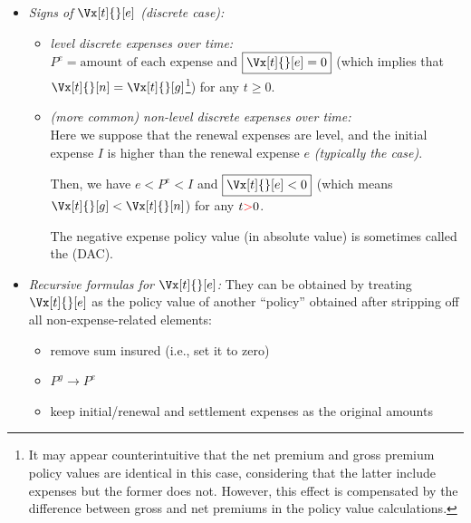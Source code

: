 \begin{enumerate}
\begin{enumerate}[label={(\arabic*)}]
\begin{itemize}
\begin{pf}
Next, for the formula of \(\Vx[t]{}[e]\), since \(P^e=P^g-P^n\), we have
\begin{align*}
\Vx[t]{}[e]&=\epvt{t}{\text{future expenses}}-\epvt{t}{\text{future expense loadings}} \\
&=\epvt{t}{\text{future benefits}}+\epvt{t}{\text{future
expenses}}-\epvt{t}{\text{future \textbf{gross} premiums}} \\
&\quad-[\epvt{t}{\text{future benefits}}-\epvt{t}{\text{future \textbf{net} premiums}}] \\
&=\Vx[t]{}[g]-\Vx[t]{}[n].
\end{align*}
\end{pf}

\item \emph{Signs of \(\Vx[t]{}[e]\) (discrete case):}
\begin{itemize}
\item \emph{level discrete expenses over time:} \\
\(\boxed{P^e=\text{amount of each expense}}\) and
\(\boxed{\Vx[t]{}[e]=0}\) (which implies that
\(\Vx[t]{}[n]=\Vx[t]{}[g]\)\footnote{ It may appear counterintuitive that the
net premium and gross premium policy values are identical in this case,
considering that the latter include expenses but the former does not. However,
this effect is compensated by the difference between gross and net premiums in
the policy value calculations.}) for any \(t\ge 0\).

\item \emph{(more common) non-level discrete expenses over time:}\\
Here we suppose that the renewal expenses are level, and the initial expense
\(I\) is higher than the renewal expense \(e\) \emph{(typically the case)}.

Then, we have \(\boxed{e<P^e<I}\) and \(\boxed{\Vx[t]{}[e]<0}\) (which means
\(\Vx[t]{}[g]<\Vx[t]{}[n]\)) for any \(t{\color{red}>}0\).

\begin{note}
The negative expense policy value (in absolute value) is sometimes called the
 (DAC).
\end{note}
\end{itemize}
\item \emph{Recursive formulas for \(\Vx[t]{}[e]\):} They can be obtained by
treating \(\Vx[t]{}[e]\) as the policy value of another ``policy'' obtained
after stripping off all non-expense-related elements:
\begin{itemize}
\item remove sum insured (i.e., set it to zero)
\item \(P^g\to P^e\)
\item keep initial/renewal and settlement expenses as the original amounts
\end{itemize}


\end{itemize}
\end{enumerate}
\end{enumerate}
